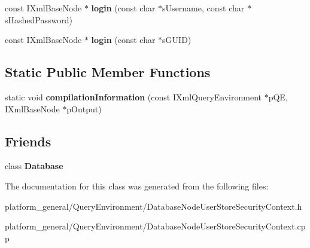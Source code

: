 \begin{DoxyCompactItemize}
\item 
\hypertarget{classgeneral__server_1_1DatabaseNodeUserStoreSecurityContext_a4b7c7177b98712f221eaf5cfd88774e8}{const \-I\-Xml\-Base\-Node $\ast$ {\bfseries login} (const char $\ast$s\-Username, const char $\ast$s\-Hashed\-Password)}\label{classgeneral__server_1_1DatabaseNodeUserStoreSecurityContext_a4b7c7177b98712f221eaf5cfd88774e8}

\item 
\hypertarget{classgeneral__server_1_1DatabaseNodeUserStoreSecurityContext_a3af0ad35c36fcbc526879e14bacf18c5}{const \-I\-Xml\-Base\-Node $\ast$ {\bfseries login} (const char $\ast$s\-G\-U\-I\-D)}\label{classgeneral__server_1_1DatabaseNodeUserStoreSecurityContext_a3af0ad35c36fcbc526879e14bacf18c5}

\end{DoxyCompactItemize}
\subsection*{\-Static \-Public \-Member \-Functions}
\begin{DoxyCompactItemize}
\item 
\hypertarget{classgeneral__server_1_1DatabaseNodeUserStoreSecurityContext_a8e1c6ec5d963130b1222a28f3771807e}{static void {\bfseries compilation\-Information} (const \-I\-Xml\-Query\-Environment $\ast$p\-Q\-E, \-I\-Xml\-Base\-Node $\ast$p\-Output)}\label{classgeneral__server_1_1DatabaseNodeUserStoreSecurityContext_a8e1c6ec5d963130b1222a28f3771807e}

\end{DoxyCompactItemize}
\subsection*{\-Friends}
\begin{DoxyCompactItemize}
\item 
\hypertarget{classgeneral__server_1_1DatabaseNodeUserStoreSecurityContext_a6efef52d7a939622bbc934ff6b90ffe0}{class {\bfseries \-Database}}\label{classgeneral__server_1_1DatabaseNodeUserStoreSecurityContext_a6efef52d7a939622bbc934ff6b90ffe0}

\end{DoxyCompactItemize}


\-The documentation for this class was generated from the following files\-:\begin{DoxyCompactItemize}
\item 
platform\-\_\-general/\-Query\-Environment/\-Database\-Node\-User\-Store\-Security\-Context.\-h\item 
platform\-\_\-general/\-Query\-Environment/\-Database\-Node\-User\-Store\-Security\-Context.\-cpp\end{DoxyCompactItemize}
